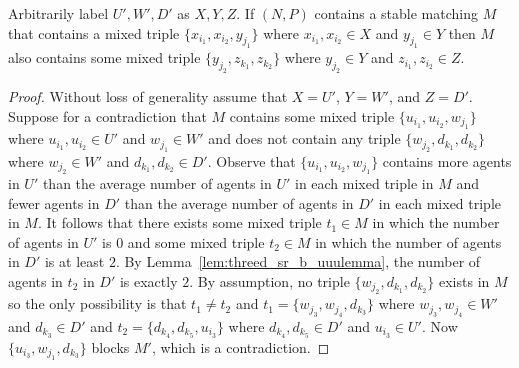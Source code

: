 \begin{lem}
\label{lem:threed_sr_b_uuw_implies_wdd}
Arbitrarily label $U', W', D'$ as $X, Y, Z$. If $(N, P)$ contains a stable matching $M$ that contains a mixed triple $\{ x_{i_1}, x_{i_2}, y_{j_1} \}$ where $x_{i_1}, x_{i_2} \in X$ and $y_{j_1} \in Y$ then $M$ also contains some mixed triple $\{ y_{j_2}, z_{k_1}, z_{k_2} \}$ where $y_{j_2} \in Y$ and $z_{i_1}, z_{i_2} \in Z$.
\end{lem}
\begin{proof}
Without loss of generality assume that $X = U'$, $Y = W'$, and $Z = D'$. Suppose for a contradiction that $M$ contains some mixed triple $\{ u_{i_1}, u_{i_2}, w_{j_1} \}$ where $u_{i_1}, u_{i_2} \in U'$ and $w_{j_1} \in W'$ and does not contain any triple $\{ w_{j_2}, d_{k_1}, d_{k_2} \}$ where $w_{j_2} \in W'$ and $d_{k_1}, d_{k_2} \in D'$. Observe that $\{ u_{i_1}, u_{i_2}, w_{j_1} \}$ contains more agents in $U'$ than the average number of agents in $U'$ in each mixed triple in $M$ and fewer agents in $D'$ than the average number of agents in $D'$ in each mixed triple in $M$. It follows that there exists some mixed triple $t_1 \in M$ in which the number of agents in $U'$ is $0$ and some mixed triple $t_2 \in M$ in which the number of agents in $D'$ is at least $2$. By Lemma~\ref{lem:threed_sr_b_uuulemma}, the number of agents in $t_2$ in $D'$ is exactly $2$. By assumption, no triple $\{ w_{j_2}, d_{k_1}, d_{k_2} \}$ exists in $M$ so the only possibility is that $t_1 \neq t_2$ and $t_1 = \{ w_{j_3}, w_{j_4}, d_{k_3} \}$ where $w_{j_3}, w_{j_4} \in W'$ and $d_{k_3} \in D'$ and $t_2 = \{ d_{k_4}, d_{k_5}, u_{i_3} \}$ where $d_{k_4}, d_{k_5} \in D'$ and $u_{i_3} \in U'$. Now $\{ u_{i_3}, w_{j_1}, d_{k_3} \}$ blocks $M'$, which is a contradiction.
\end{proof}

